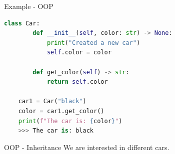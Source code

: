 \documentclass{beamer}
\begin{document}
\begin{frame}[fragile]{Example - OOP}
    \begin{lstlisting}[language=Python]
    class Car:
        def __init__(self, color: str) -> None:
            print("Created a new car")
            self.color = color

        def get_color(self) -> str:
            return self.color
        
    car1 = Car("black")
    color = car1.get_color()
    print(f"The car is: {color}")
    >>> The car is: black
    \end{lstlisting}
       
\end{frame}

\begin{frame}{OOP - Inheritance}
    We are interested in different cars.\\\pause
\end{frame}
\end{document}
